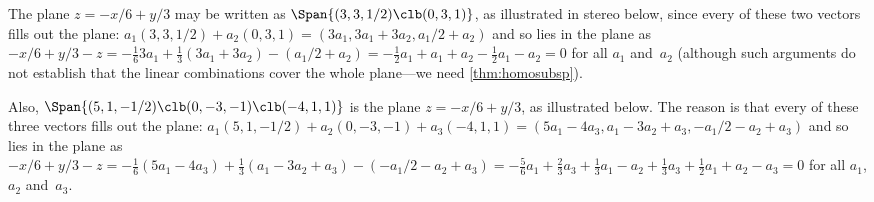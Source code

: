 \begin{example} \label{eg:plsubs}
The plane \(z=-x/6+y/3\) may be written as \(\Span\{(3,3,1/2)\clb (0,3,1)\}\), as illustrated in stereo below, since every  of these two vectors fills out the plane: \(a_1(3,3,1/2)+a_2(0,3,1) =(3a_1,3a_1+3a_2,a_1/2+a_2)\) and so lies in the plane as \(-x/6+y/3-z=-\frac163a_1+\frac13(3a_1+3a_2)-(a_1/2+a_2) =-\frac12a_1+a_1+a_2-\frac12a_1-a_2=0\) for all \(a_1\) and~\(a_2\) (although such arguments do not establish that the linear combinations cover the whole plane---we need \cref{thm:homosubsp}).
\begin{center}
 {}
\end{center}
Also,  \(\Span\{(5,1,-1/2)\clb (0,-3,-1)\clb (-4,1,1)\}\) is the  plane \(z=-x/6+y/3\), as illustrated below. 
The reason is that every  of these three vectors fills out the plane: \(a_1(5,1,-1/2)+a_2(0,-3,-1)+a_3(-4,1,1) =(5a_1-4a_3, a_1-3a_2+a_3, -a_1/2-a_2+a_3)\) and so lies in the plane as \(-x/6+y/3-z=-\frac16(5a_1-4a_3)+\frac13(a_1-3a_2+a_3)-(-a_1/2-a_2+a_3) =-\frac56a_1+\frac23a_3+\frac13a_1-a_2+\frac13a_3+\frac12a_1+a_2-a_3 =0\) for all \(a_1\), \(a_2\) and~\(a_3\).
\begin{center}
 {}
\end{center}
\end{example}


